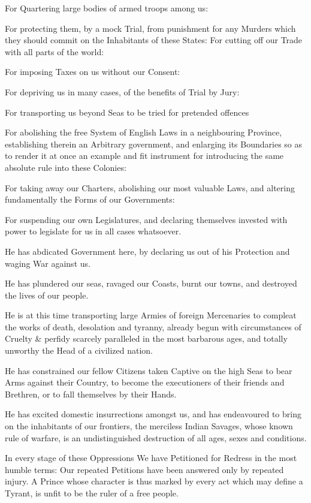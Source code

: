 For Quartering large bodies of armed troops among us:

For protecting them, by a mock Trial, from punishment for any Murders
which they should commit on the Inhabitants of these States: For
cutting off our Trade with all parts of the world:

For imposing Taxes on us without our Consent:

For depriving us in many cases, of the benefits of Trial by Jury:

For transporting us beyond Seas to be tried for pretended offences

For abolishing the free System of English Laws in a neighbouring
Province, establishing therein an Arbitrary government, and enlarging
its Boundaries so as to render it at once an example and fit
instrument for introducing the same absolute rule into these
Colonies:

For taking away our Charters, abolishing our most valuable Laws, and
altering fundamentally the Forms of our Governments:

For suspending our own Legislatures, and declaring themselves invested
with power to legislate for us in all cases whatsoever.

He has abdicated Government here, by declaring us out of his
Protection and waging War against us.

He has plundered our seas, ravaged our Coasts, burnt our towns, and
destroyed the lives of our people.

He is at this time transporting large Armies of foreign Mercenaries to
compleat the works of death, desolation and tyranny, already begun
with circumstances of Cruelty \& perfidy scarcely paralleled in the
most barbarous ages, and totally unworthy the Head of a civilized
nation.

He has constrained our fellow Citizens taken Captive on the high Seas
to bear Arms against their Country, to become the executioners of
their friends and Breth\-ren, or to fall themselves by their Hands.

He has excited domestic insurrections amongst us, and has endeavoured
to bring on the inhabitants of our frontiers, the merciless Indian
Savages, whose known rule of warfare, is an undistinguished
destruction of all ages, sexes and conditions.

In every stage of these Oppressions We have Petitioned for Redress in
the most humble terms: Our repeated Petitions have been answered only
by repeated injury. A Prince whose character is thus marked by every
act which may define a Tyrant, is unfit to be the ruler of a free
people.

